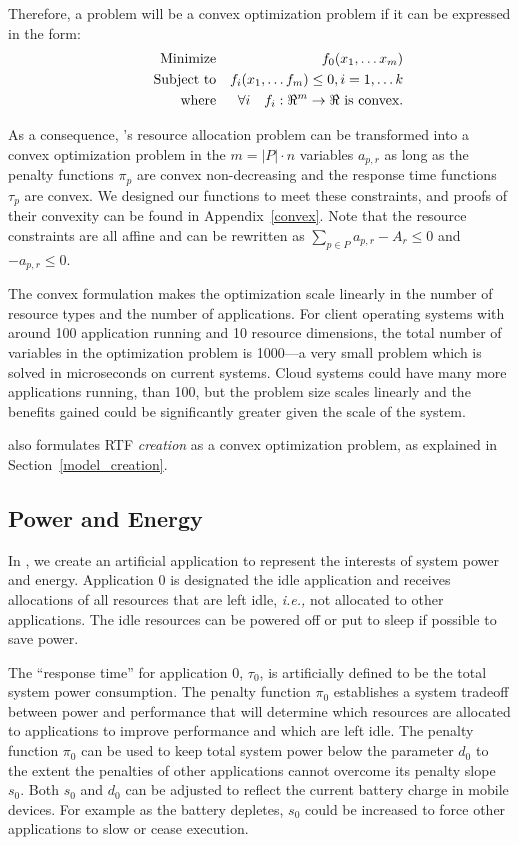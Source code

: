 Therefore, a problem will be a convex optimization problem if it can be expressed in the form:
\begin{eqnarray*}
& \makebox[1in][r]{Minimize}   & f_0(x_1,\ldots x_m)                              \\
& \makebox[1in][r]{Subject to} & f_i(x_1,\ldots f_m) \leq 0, i = 1,\ldots k        \\
& \makebox[1in][r]{where}      & \forall i \quad f_i:\Re^m \rightarrow \Re \mbox{ is convex.}
\end{eqnarray*}


As a consequence, \pacora's resource allocation problem can be transformed into a convex optimization problem in the $m = |P|\cdot n$ variables $a_{p,r}$ as long as the penalty functions $\pi_p$ are convex non-decreasing and the response time functions $\tau_p$ are convex.  We designed our functions to meet these constraints, and proofs of their convexity can be found in Appendix~\ref{convex}. Note that the resource constraints are all affine and can be rewritten as
$\sum_{p\in P} a_{p,r} - A_r \leq 0$ and $-a_{p,r} \leq 0$.

The convex formulation makes the optimization scale linearly in the number of resource types and the number of applications.   For client operating systems with around 100 application running and 10 resource dimensions, the total number of variables in the optimization problem is 1000---a very small problem which is solved in microseconds on current systems.  Cloud systems could have many more applications running,
than 100, but the problem size scales linearly and the benefits gained could be significantly greater given the scale of the system.

\pacora also formulates RTF \emph{creation} as a convex optimization problem, as explained in Section~\ref{model_creation}.

\subsection*{Power and Energy}
In \pacora, we create an artificial application to represent the interests of system power and energy.  Application 0 is designated the idle application and receives allocations of all resources
that are left idle, \emph{i.e.,} not allocated to other applications.   The idle resources can be powered off or put to sleep if possible to save power.

The ``response time'' for application 0, $\tau_0$, is artificially defined to be the total system power consumption.
The penalty function $\pi_0$ establishes a system tradeoff between power and performance that
will determine which resources are allocated to applications to improve performance and which are left idle.
The penalty function $\pi_0$ can be used to keep total system power below the parameter $d_0$
to the extent the penalties of other applications cannot overcome its penalty slope $s_0$. Both $s_0$ and $d_0$ can be adjusted to reflect the current battery charge in mobile devices. For example as the battery depletes, $s_0$ could be increased to force other applications to slow or cease execution.

